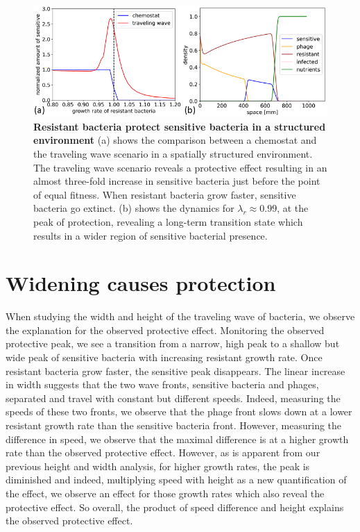 \begin{figure}
\centering
\includegraphics[width=\linewidth]{graphics/2025_09_29_phages_fig4.png}
\caption{\textbf{Resistant bacteria protect sensitive bacteria in a structured environment} (a) shows the comparison between a chemostat and the traveling wave scenario in a spatially structured environment. The traveling wave scenario reveals a protective effect resulting in an almost three-fold increase in sensitive bacteria just before the point of equal fitness. When resistant bacteria grow faster, sensitive bacteria go extinct. (b) shows the dynamics for $\lambda_r \approx 0.99$, at the peak of protection, revealing a long-term transition state which results in a wider region of sensitive bacterial presence.}
\label{fig:protective_effect}
\end{figure}

\section{Widening causes protection}
When studying the width and height of the traveling wave of bacteria, we observe the explanation for the observed protective effect. Monitoring the observed protective peak, we see a transition from a narrow, high peak to a shallow but wide peak of sensitive bacteria with increasing resistant growth rate. Once resistant bacteria grow faster, the sensitive peak disappears. The linear increase in width suggests that the two wave fronts, sensitive bacteria and phages, separated and travel with constant but different speeds. Indeed, measuring the speeds of these two fronts, we observe that the phage front slows down at a lower resistant growth rate than the sensitive bacteria front. However, measuring the difference in speed, we observe that the maximal difference is at a higher growth rate than the observed protective effect. However, as is apparent from our previous height and width analysis, for higher growth rates, the peak is diminished and indeed, multiplying speed with height as a new quantification of the effect, we observe an effect for those growth rates which also reveal the protective effect. So overall, the product of speed difference and height explains the observed protective effect. 


